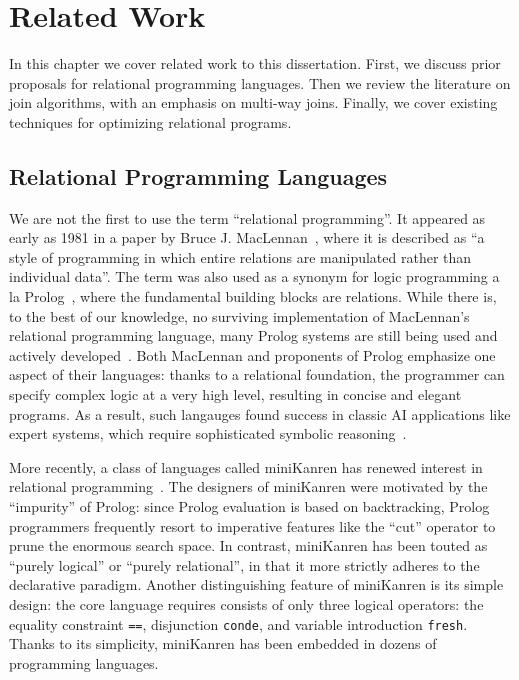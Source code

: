 \chapter{Related Work}
\label{chap:related}

In this chapter we cover related work to this dissertation.
First, we discuss prior proposals for relational programming languages.
Then we review the literature on join algorithms, with an emphasis on multi-way joins.
Finally, we cover existing techniques for optimizing relational programs.

\section{Relational Programming Languages}
\label{sec:related:relational}

We are not the first to use the term ``relational programming''.
It appeared as early as 1981 in a paper by Bruce J. MacLennan~\cite{maclennan1981introduction}, 
 where it is described as ``a style of programming in which entire relations 
 are manipulated rather than individual data''.
The term was also used as a synonym for logic programming a la Prolog~\cite{colmerauer1990introduction}, 
 where the fundamental building blocks are relations.
While there is, to the best of our knowledge, no surviving implementation of MacLennan's relational programming language, 
 many Prolog systems are still being used and actively 
 developed~\cite{zhou2012language, bueno1997ciao, diaz2001design, prolog2021scryer, wielemaker2012swi}.
Both MacLennan and proponents of Prolog emphasize one aspect of their languages: 
 thanks to a relational foundation, the programmer can specify 
 complex logic at a very high level, resulting in concise and elegant programs.
As a result, such langauges found success in classic AI applications
 like expert systems, which require sophisticated symbolic reasoning~\cite{korner2022fifty}.

More recently, a class of languages called miniKanren has renewed interest 
 in relational programming~\cite{byrd2009relational, byrd2012minikanren, rozplokhas2019certified, DBLP:books/daglib/0015651}.
The designers of miniKanren were motivated by the ``impurity'' of Prolog: 
 since Prolog evaluation is based on backtracking, 
 Prolog programmers frequently resort to imperative features like the ``cut'' operator 
 to prune the enormous search space.
In contrast, miniKanren has been touted as ``purely logical'' or ``purely relational'', 
 in that it more strictly adheres to the declarative paradigm.
Another distinguishing feature of miniKanren is its simple design: 
 the core language requires consists of only three logical operators: 
 the equality constraint \verb|==|, disjunction \verb|conde|, 
 and variable introduction \verb|fresh|.
Thanks to its simplicity, miniKanren has been embedded in dozens of programming languages. 

